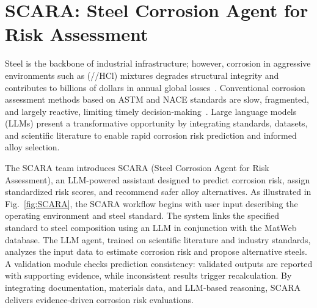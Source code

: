 





\section{SCARA: Steel Corrosion Agent for Risk Assessment}



Steel is the backbone of industrial infrastructure; however, corrosion in aggressive environments such as (//HCl) mixtures degrades structural integrity and contributes to billions of dollars in annual global losses~\cite{SCARA1}. Conventional corrosion assessment methods based on ASTM and NACE standards are slow, fragmented, and largely reactive, limiting timely decision-making~\cite{SCARA2}. Large language models (LLMs) present a transformative opportunity by integrating standards, datasets, and scientific literature to enable rapid corrosion risk prediction and informed alloy selection.

The SCARA team introduces SCARA (Steel Corrosion Agent for Risk Assessment), an LLM-powered assistant designed to predict corrosion risk, assign standardized risk scores, and recommend safer alloy alternatives. As illustrated in Fig.~\ref{fig:SCARA}, the SCARA workflow begins with user input describing the operating environment and steel standard. The system links the specified standard to steel composition using an LLM in conjunction with the MatWeb database. The LLM agent, trained on scientific literature and industry standards, analyzes the input data to estimate corrosion risk and propose alternative steels. A validation module checks prediction consistency: validated outputs are reported with supporting evidence, while inconsistent results trigger recalculation. By integrating documentation, materials data, and LLM-based reasoning, SCARA delivers evidence-driven corrosion risk evaluations.

